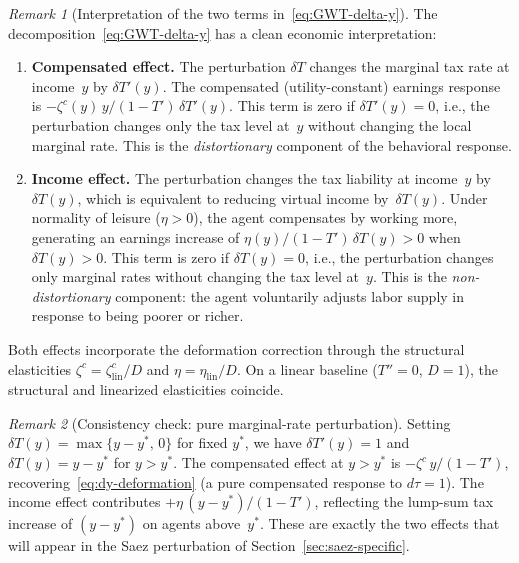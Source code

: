 \documentclass[12pt,a4paper]{article}
\theoremstyle{definition}
\theoremstyle{plain}
\theoremstyle{remark}
\newtheorem{remark}{Remark}[section]
\begin{document}
\begin{remark}[Interpretation of the two terms in~\eqref{eq:GWT-delta-y}]
\label{rem:GWT-two-terms}
The decomposition~\eqref{eq:GWT-delta-y} has a clean economic interpretation:
\begin{enumerate}[label=(\roman*)]
  \item \textbf{Compensated effect.} The perturbation $\delta T$ changes the marginal tax rate at income~$y$ by $\delta T'(y)$.  The compensated (utility-constant) earnings response is $-\zeta^c(y)\,y/(1-T')\,\delta T'(y)$.  This term is zero if $\delta T'(y) = 0$, i.e., the perturbation changes only the tax level at~$y$ without changing the local marginal rate.  This is the \emph{distortionary} component of the behavioral response.

  \item \textbf{Income effect.} The perturbation changes the tax liability at income~$y$ by $\delta T(y)$, which is equivalent to reducing virtual income by~$\delta T(y)$.  Under normality of leisure ($\eta > 0$), the agent compensates by working more, generating an earnings increase of $\eta(y)/(1-T')\,\delta T(y) > 0$ when $\delta T(y) > 0$.  This term is zero if $\delta T(y) = 0$, i.e., the perturbation changes only marginal rates without changing the tax level at~$y$.  This is the \emph{non-distortionary} component: the agent voluntarily adjusts labor supply in response to being poorer or richer.
\end{enumerate}

\noindent
Both effects incorporate the deformation correction through the structural elasticities $\zeta^c = \zeta^c_{\mathrm{lin}}/D$ and $\eta = \eta_{\mathrm{lin}}/D$.  On a linear baseline ($T'' = 0$, $D = 1$), the structural and linearized elasticities coincide.
\end{remark}

\begin{remark}[Consistency check: pure marginal-rate perturbation]
\label{rem:GWT-consistency}
Setting $\delta T(y) = \max\{y - y^*,\,0\}$ for fixed $y^*$, we have $\delta T'(y) = 1$ and $\delta T(y) = y - y^*$ for $y > y^*$.  The compensated effect at $y > y^*$ is $-\zeta^c\,y/(1-T')$, recovering~\eqref{eq:dy-deformation} (a pure compensated response to $d\tau = 1$).  The income effect contributes $+\eta\,(y-y^*)/(1-T')$, reflecting the lump-sum tax increase of $(y-y^*)$ on agents above~$y^*$.  These are exactly the two effects that will appear in the Saez perturbation of Section~\ref{sec:saez-specific}.
\end{remark}
\end{document}
